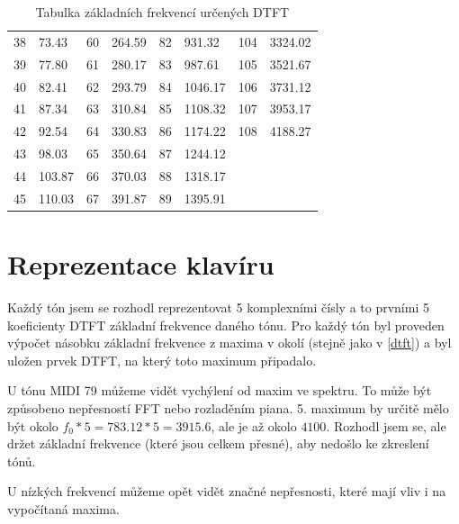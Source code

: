 \documentclass[a4paper, 12pt]{article}
\begin{document}
\begin{table}[H]
\begin{tabularx}{\textwidth}{r|Xr|Xr|Xr|X}
			38 & 73.43     &       60 & 264.59     &       82 & 931.32     &       104 & 3324.02 \\
			39 & 77.80     &       61 & 280.17     &       83 & 987.61     &       105 & 3521.67 \\
			40 & 82.41     &       62 & 293.79     &       84 & 1046.17    &       106 & 3731.12 \\
			41 & 87.34     &       63 & 310.84     &       85 & 1108.32    &       107 & 3953.17 \\
			42 & 92.54     &       64 & 330.83     &       86 & 1174.22    &       108 & 4188.27 \\
			43 & 98.03     &       65 & 350.64     &       87 & 1244.12    & & \\
			44 & 103.87    &       66 & 370.03     &       88 & 1318.17    & & \\
			45 & 110.03    &       67 & 391.87     &       89 & 1395.91    & & \\
		\end{tabularx}
	\caption{Tabulka základních frekvencí určených DTFT}
	\end{table}
	
	\section{Reprezentace klavíru}
	Každý tón jsem se rozhodl reprezentovat 5 komplexními čísly a to prvními 5 koeficienty DTFT základní frekvence daného tónu. Pro každý tón byl proveden výpočet násobku základní frekvence z maxima v okolí (stejně jako v \ref{dtft}) a byl uložen prvek DTFT, na který toto maximum připadalo.
	
	U tónu MIDI 79 můžeme vidět vychýlení od maxim ve spektru. To může být způsobeno nepřesností FFT nebo rozladěním piana. 5. maximum by určitě mělo být okolo $f_0 * 5 = 783.12 * 5 = 3915.6$, ale je až okolo $4100$. Rozhodl jsem se, ale držet základní frekvence (které jsou celkem přesné), aby nedošlo ke zkreslení tónů.
	
	U nízkých frekvencí můžeme opět vidět značné nepřesnosti, které mají vliv i na vypočítaná maxima.
	
\end{document}
